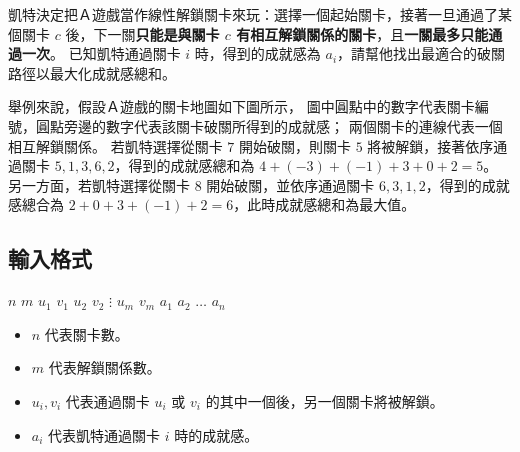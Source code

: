凱特決定把Ａ遊戲當作線性解鎖關卡來玩：選擇一個起始關卡，接著一旦通過了某個關卡
\(c\) 後，下一關\textbf{只能是與關卡 \(c\)
有相互解鎖關係的關卡}，且\textbf{一關最多只能通過一次}。
已知凱特通過關卡 \(i\) 時，得到的成就感為
\(a_i\)，請幫他找出最適合的破關路徑以最大化成就感總和。

舉例來說，假設Ａ遊戲的關卡地圖如下圖所示，
圖中圓點中的數字代表關卡編號，圓點旁邊的數字代表該關卡破關所得到的成就感；
兩個關卡的連線代表一個相互解鎖關係。 若凱特選擇從關卡 \(7\)
開始破關，則關卡 \(5\) 將被解鎖，接著依序通過關卡
\(5, 1, 3, 6, 2\)，得到的成就感總和為 \(4+(-3)+(-1)+3+0+2 = 5\)。
另一方面，若凱特選擇從關卡 \(8\) 開始破關，並依序通過關卡
\(6, 3, 1, 2\)，得到的成就感總合為
\(2+0+3+(-1)+2 = 6\)，此時成就感總和為最大值。

\begin{figure}[h]
   \centering
\end{figure}

\subsection{輸入格式}

\begin{format}
\f{
$n$ $m$
$u_1$ $v_1$
$u_2$ $v_2$
$\vdots$
$u_m$ $v_m$
$a_1$ $a_2$ $\ldots$ $a_n$
}
\end{format}

\begin{itemize}
\tightlist
\item
  \(n\) 代表關卡數。
\item
  \(m\) 代表解鎖關係數。
\item
  \(u_i, v_i\) 代表通過關卡 \(u_i\) 或 \(v_i\)
  的其中一個後，另一個關卡將被解鎖。
\item
  \(a_i\) 代表凱特通過關卡 \(i\) 時的成就感。
\end{itemize}

